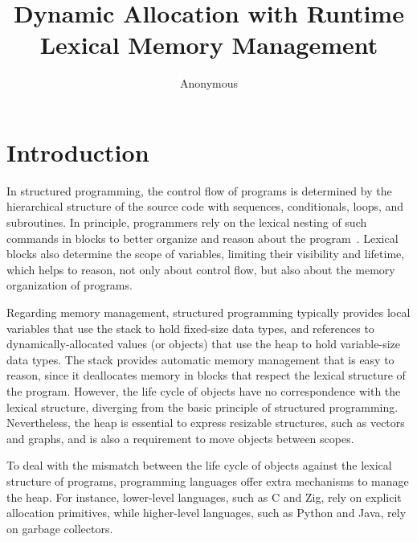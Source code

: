 \documentclass[12pt]{article}
\title {
    Dynamic Allocation with Runtime Lexical Memory Management
}
\author{Anonymous}
\begin{document}
\maketitle

\begin{abstract}
\end{abstract}


\section{Introduction}
\label{sec.intro}

In structured programming, the control flow of programs is determined by the
hierarchical structure of the source code with sequences, conditionals, loops,
and subroutines.
%
In principle, programmers rely on the lexical nesting of such commands in
blocks to better organize and reason about the
program~\cite{dijk.goto,dijk.notes}.
%
Lexical blocks also determine the scope of variables, limiting their visibility
and lifetime, which helps to reason, not only about control flow, but also
about the memory organization of programs.

Regarding memory management, structured programming typically provides local
variables that use the stack to hold fixed-size data types, and references to
dynamically-allocated values (or objects) that use the heap to hold
variable-size data types.
%
The stack provides automatic memory management that is easy to reason, since it
deallocates memory in blocks that respect the lexical structure of the program.
%
However, the life cycle of objects have no correspondence with the lexical
structure, diverging from the basic principle of structured programming.
%
Nevertheless, the heap is essential to express resizable structures, such as
vectors and graphs, and is also a requirement to move objects between scopes.

To deal with the mismatch between the life cycle of objects against the lexical
structure of programs, programming languages offer extra mechanisms to manage
the heap.
%
For instance, lower-level languages, such as C and Zig, rely on explicit
allocation primitives, while higher-level languages, such as Python and Java,
rely on garbage collectors.
\end{document}
